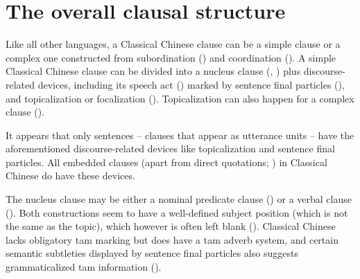 \documentclass[UTF8, a4paper, oneside, scheme=plain, 12pt]{ctexrep}
\begin{document}
\section{The overall clausal structure}\label{sec:grammatical.clause}

Like all other languages, a Classical Chinese clause can be a simple clause
or a complex one constructed from subordination ()
and coordination ().
A simple Classical Chinese clause can be divided into a nucleus clause (, )
plus discourse-related devices,
including its speech act () marked by sentence final particles (),
and topicalization or focalization ().
Topicalization can also happen for a complex clause ().

It appears that only sentences -- clauses that appear as utterance units -- have the aforementioned discourse-related devices like topicalization and sentence final particles.
All embedded clauses (apart from direct quotations; ) in Classical Chinese do have these devices.

The nucleus clause may be either a nominal predicate clause ()
or a verbal clause ().
Both constructions seem to have a well-defined subject position (which is not the same as the topic),
which however is often left blank ().
Classical Chinese lacks obligatory \ac{tam} marking but does have a \ac{tam} adverb system, and certain semantic subtleties displayed by sentence final particles also suggests grammaticalized \ac{tam} information ().
\end{document}
